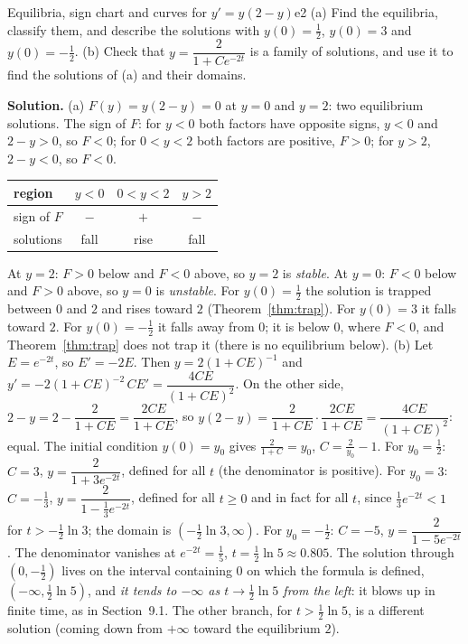 \documentclass[11pt]{article}
\begin{document}
\begin{exmp}{Equilibria, sign chart and curves for $y'=y(2-y)$}{e2}
(a) Find the equilibria, classify them, and describe the solutions with $y(0)=\frac12$, $y(0)=3$ and $y(0)=-\frac12$. (b) Check that $y=\dfrac{2}{1+Ce^{-2t}}$ is a family of solutions, and use it to find the solutions of (a) and their domains.

\textbf{Solution.} (a) $F(y)=y(2-y)=0$ at $y=0$ and $y=2$: two equilibrium solutions. The sign of $F$: for $y<0$ both factors have opposite signs, $y<0$ and $2-y>0$, so $F<0$; for $0<y<2$ both factors are positive, $F>0$; for $y>2$, $2-y<0$, so $F<0$.
\begin{center}
\begin{tabular}{lccc}
\toprule region & $y<0$ & $0<y<2$ & $y>2$\\\midrule
sign of $F$ & $-$ & $+$ & $-$\\
solutions & fall & rise & fall\\\bottomrule
\end{tabular}
\end{center}
At $y=2$: $F>0$ below and $F<0$ above, so $y=2$ is \emph{stable}. At $y=0$: $F<0$ below and $F>0$ above, so $y=0$ is \emph{unstable}. For $y(0)=\frac12$ the solution is trapped between $0$ and $2$ and rises toward $2$ (Theorem~\ref{thm:trap}). For $y(0)=3$ it falls toward $2$. For $y(0)=-\frac12$ it falls away from $0$; it is below $0$, where $F<0$, and Theorem~\ref{thm:trap} does not trap it (there is no equilibrium below).
(b) Let $E=e^{-2t}$, so $E'=-2E$. Then $y=2(1+CE)^{-1}$ and $y'=-2(1+CE)^{-2}\,CE'=\dfrac{4CE}{(1+CE)^2}$. On the other side, $2-y=2-\dfrac{2}{1+CE}=\dfrac{2CE}{1+CE}$, so $y(2-y)=\dfrac2{1+CE}\cdot\dfrac{2CE}{1+CE}=\dfrac{4CE}{(1+CE)^2}$: equal.
The initial condition $y(0)=y_0$ gives $\frac2{1+C}=y_0$, $C=\frac2{y_0}-1$. For $y_0=\frac12$: $C=3$, $y=\dfrac2{1+3e^{-2t}}$, defined for all $t$ (the denominator is positive). For $y_0=3$: $C=-\frac13$, $y=\dfrac2{1-\frac13e^{-2t}}$, defined for all $t\ge0$ and in fact for all $t$, since $\frac13e^{-2t}<1$ for $t>-\frac12\ln3$; the domain is $(-\frac12\ln3,\infty)$. For $y_0=-\frac12$: $C=-5$, $y=\dfrac2{1-5e^{-2t}}$. The denominator vanishes at $e^{-2t}=\frac15$, $t=\frac12\ln5\approx0.805$. The solution through $(0,-\frac12)$ lives on the interval containing $0$ on which the formula is defined, $(-\infty,\frac12\ln5)$, and \emph{it tends to $-\infty$ as $t\to\frac12\ln5$ from the left}: it blows up in finite time, as in Section~9.1. The other branch, for $t>\frac12\ln5$, is a different solution (coming down from $+\infty$ toward the equilibrium $2$).

\end{exmp}
\end{document}
